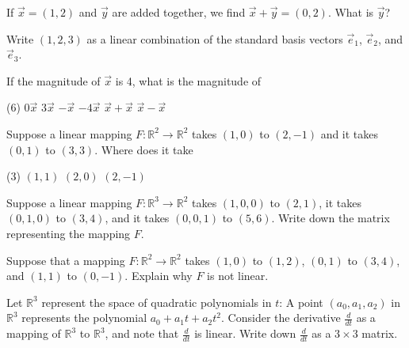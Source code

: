 \begin{exercise}
If $\vec{x} = (1,2)$ and $\vec{y}$ are added together, we find
$\vec{x}+\vec{y} = (0,2)$.  What is $\vec{y}$?
\end{exercise}

\begin{exercise}
Write $(1,2,3)$ as a linear combination of the standard basis vectors
$\vec{e}_1$, $\vec{e}_2$, and $\vec{e}_3$.
\end{exercise}

\begin{exercise}
If the magnitude of $\vec{x}$ is 4, what is the magnitude of
\begin{tasks}(6)
\task
$0\vec{x}$
\task
$3\vec{x}$
\task
$-\vec{x}$
\task
$-4\vec{x}$
\task
$\vec{x}+\vec{x}$
\task
$\vec{x}-\vec{x}$
\end{tasks}
\end{exercise}

\begin{exercise}
Suppose a linear mapping $F \colon {\mathbb R}^2 \to {\mathbb R}^2$
takes $(1,0)$ to $(2,-1)$ and it takes $(0,1)$ to $(3,3)$.
Where does it take
\begin{tasks}(3)
\task
$(1,1)$
\task
$(2,0)$
\task
$(2,-1)$
\end{tasks}
\end{exercise}

\begin{exercise}
Suppose a linear mapping $F \colon {\mathbb R}^3 \to {\mathbb R}^2$
takes $(1,0,0)$ to $(2,1)$, it takes $(0,1,0)$ to $(3,4)$, and
it takes $(0,0,1)$ to $(5,6)$.  Write down the matrix representing
the mapping $F$.
\end{exercise}

\begin{exercise}
Suppose that a mapping $F \colon {\mathbb R}^2 \to \mathbb{R}^2$ takes
$(1,0)$ to $(1,2)$, $(0,1)$ to $(3,4)$, and $(1,1)$ to $(0,-1)$.
Explain why $F$ is not linear.
\end{exercise}

\begin{exercise}[challenging]
Let ${\mathbb R}^3$ represent the space of quadratic polynomials
in $t$: A point $(a_0,a_1,a_2)$ in ${\mathbb R}^3$ represents
the polynomial $a_0 + a_1 t + a_2 t^2$.
Consider the derivative $\frac{d}{dt}$ as a mapping of ${\mathbb R}^3$ to
${\mathbb R}^3$,
and note that $\frac{d}{dt}$ is linear.
Write down $\frac{d}{dt}$ as a $3 \times 3$ matrix.
\end{exercise}

